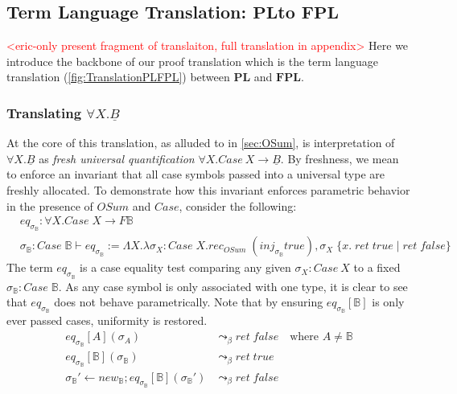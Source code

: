 \documentclass[acmsmall]{acmart}
\newcommand{\eric}[1]{\textcolor{red}{ <eric-#1> }}
\newcommand{\pl}{$\mathbf{PL}$}
\newcommand{\fpl}{$\mathbf{FPL}$}
\begin{document}
\subsection{Term Language Translation: \pl\;to \fpl}

\eric{only present fragment of translaiton, full translation in appendix}
Here we introduce the backbone of our proof translation which is the term language translation (\cref{fig:TranslationPLFPL}) between \pl\; and \fpl. 
\subsubsection{Translating $\forall X. \underline{B}$}\label{sec:TranslateForall}
At the core of this translation, as alluded to in \cref{sec:OSum}, is interpretation of $\forall X. \underline{B}$ as \textit{fresh universal quantification} $\forall X. Case\:X \to \underline{B}$. By freshness, we mean to enforce an invariant that all case symbols passed into a universal type are freshly allocated. To demonstrate how this invariant enforces parametric behavior in the presence of $OSum$ and $Case$, consider the following:
\begin{align*}
  &eq_{\sigma_{\mathbb{B}}} : \forall X. Case\;X \to F \mathbb{B}\\
  &\sigma_{\mathbb{B}}: Case\;\mathbb{B}\vdash eq_{\sigma_{\mathbb{B}}} := \Lambda X. \lambda \sigma_X: Case\;X .rec_{OSum}\; (inj_{\sigma_{\mathbb{B}}} true),\sigma_X \; \{x.\;ret\;true\;|\; ret\;false\} 
\end{align*}
The term $eq_{\sigma_{\mathbb{B}}}$ is a case equality test comparing any given $\sigma_X:Case\:X$ to a fixed $\sigma_{\mathbb{B}}:Case\;\mathbb{B}$. As any case symbol is only associated with one type, it is clear to see that $eq_{\sigma_{\mathbb{B}}}$ does not behave parametrically. Note that by ensuring $eq_{\sigma_{\mathbb{B}}}[\mathbb{B}]$ is only ever passed  cases, uniformity is restored.
\begin{align*}
  eq_{\sigma_{\mathbb{B}}}[A](\sigma_A) &\leadsto_{\beta} ret\;false \quad\text{where } A\neq \mathbb{B}\\
  eq_{\sigma_{\mathbb{B}}}[\mathbb{B}](\sigma_{\mathbb{B}}) &\leadsto_{\beta} ret\;true\\
  \sigma_{\mathbb{B}}' \leftarrow new_{\mathbb{B}};eq_{\sigma_{\mathbb{B}}}[\mathbb{B}](\sigma_{\mathbb{B}}') &\leadsto_{\beta} ret\;false\quad\\
\end{align*} 
\end{document}
